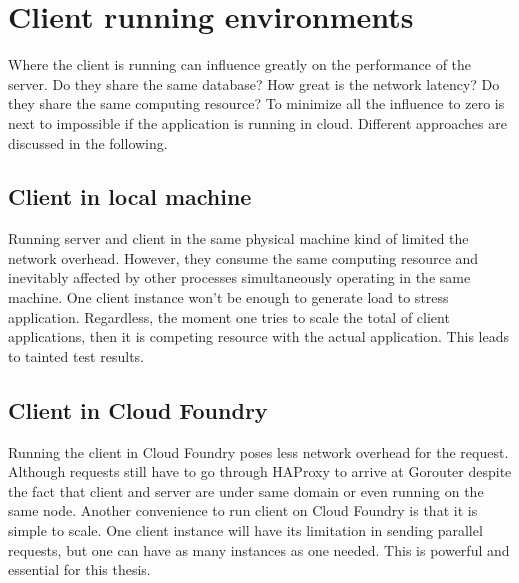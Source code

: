 \section{ Client running environments}
Where the client is running can influence greatly on the performance of the server. Do they share the same database? How great is the network latency? Do they share the same computing resource? To minimize all the influence to zero is next to impossible if the application is running in cloud. Different approaches are discussed in the following. 

\subsection{Client in local machine}
Running server and client in the same physical machine kind of limited the network overhead. However, they consume the same computing resource and inevitably affected by other processes simultaneously operating in the same machine. One client instance won't be enough to generate load to stress application. Regardless, the moment one tries to scale the total of client applications, then it is competing resource with the actual application. This leads to tainted test results.  
\subsection{Client in Cloud Foundry}
Running the client in Cloud Foundry poses less network overhead for the request. Although requests still have to go through HAProxy to arrive at Gorouter despite the fact that client and server are under same domain or even running on the same node. Another convenience to run client on Cloud Foundry is that it is simple to scale. One client instance will have its limitation in sending parallel requests, but one can have as many instances as one needed. This is powerful and essential for this thesis. 


